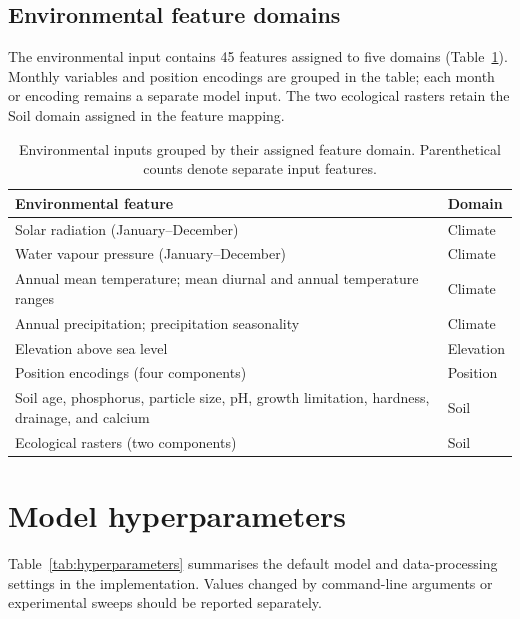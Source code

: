 \documentclass[preprint,12pt,authoryear]{elsarticle}
\begin{document}
\subsection{Environmental feature domains}
\label{app:features-domains}

The environmental input contains 45 features assigned to five domains (Table~\ref{tab:environmental-domains}). Monthly variables and position encodings are grouped in the table; each month or encoding remains a separate model input. The two ecological rasters retain the Soil domain assigned in the feature mapping.

\begin{table}[ht]
\centering
\small
\begin{tabularx}{\linewidth}{@{}Xl@{}}
\toprule
\textbf{Environmental feature} & \textbf{Domain} \\
\midrule
Solar radiation (January--December) & Climate \\
Water vapour pressure (January--December) & Climate \\
Annual mean temperature; mean diurnal and annual temperature ranges & Climate \\
Annual precipitation; precipitation seasonality & Climate \\
Elevation above sea level & Elevation \\
Position encodings (four components) & Position \\
Soil age, phosphorus, particle size, pH, growth limitation, hardness, drainage, and calcium & Soil \\
Ecological rasters (two components) & Soil \\
\bottomrule
\end{tabularx}
\caption{Environmental inputs grouped by their assigned feature domain. Parenthetical counts denote separate input features.}
\label{tab:environmental-domains}
\end{table}

\clearpage

\section{Model hyperparameters}
\label{app:hyperparameters}

Table~\ref{tab:hyperparameters} summarises the default model and data-processing settings in the implementation. Values changed by command-line arguments or experimental sweeps should be reported separately.
\end{document}
